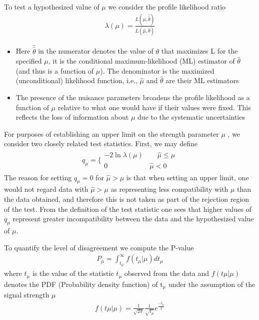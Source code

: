 \begin{linenumbers}
To test a hypothesized value of $\mu$ we consider the profile likelihood ratio
\begin{align}
\lambda(\mu)=\frac{L(\mu,\hat{\hat{\theta}})}{L(\hat{\mu},\hat{\theta})}
\end{align}

	\begin{itemize}
		\item Here $\hat{\hat{\theta}} $ in the numerator denotes the value of $\theta$ that maximizes L for the specified $\mu$,
		it is the conditional maximum-likelihood (ML) estimator of $\hat{\theta}$ (and thus is a function of $\mu$).
		The denominator is the maximized (unconditional) likelihood function, i.e., $\hat{\mu}$ and $\hat{\theta}$ are
		their ML estimators 
		\item The presence of the nuisance parameters broadens the profile likelihood as a
		function of $\mu$ relative to what one would have if their values were fixed. This reflects the loss
		of information about $\mu$ due to the systematic uncertainties
	\end{itemize}

For purposes of establishing an upper limit on the strength parameter $\mu$ , we consider two
closely related test statistics. First, we may define
\begin{align} 
q_{\mu}=  \Big\{    \begin{array}{ll}
                 -2\ln\lambda(\mu) \qquad \hat{\mu} \leq \mu	\\
0  \qquad \qquad \qquad \hat{\mu}< 0 
                \end{array}
\end{align}
 The reason for setting $q_\mu = 0$
for $\hat{\mu}>\mu $ is that when setting an upper limit, one would not regard data with $\hat{\mu}>\mu $ as
representing less compatibility with $\mu$ than the data obtained, and therefore this is not taken
as part of the rejection region of the test. From the definition of the test statistic one sees that
higher values of $q_\mu$ represent greater incompatibility between the data and the hypothesized
value of $\mu$.


To quantify the level of disagreement we compute the P-value
\begin{align}
P_\mu =\int_{t_\mu}^{\infty}f(t_\mu |\mu) dt_\mu
\end{align}
where $t_\mu$  is the value of the statistic $t_\mu$ observed from the data and $f(t\mu |\mu)$ denotes
the PDF (Probability density function) of t$_\mu$ under the assumption of the signal strength $\mu$
\begin{align}
f(t\mu |\mu)=\frac{1}{\sqrt{2\pi}} \frac{1}{\sqrt{t_\mu}}e^\frac{-t_\mu}{2}
\end{align}


\end{linenumbers}
